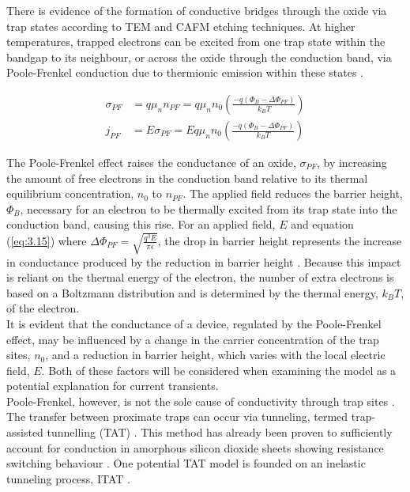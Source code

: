 \noindent There is evidence of the formation of conductive bridges through the oxide via trap states according to TEM \cite{munde2017intrinsic, wu2015evolution} and CAFM \cite{buckwell2015conductance} etching techniques. At higher temperatures, trapped electrons can be excited from one trap state within the bandgap to its neighbour, or across the oxide through the conduction band, via Poole-Frenkel conduction due to thermionic emission within these states \cite{frenkel1938pre}.

\begin{align}
    \sigma_{PF} &= q \mu_n n_{PF} = q \mu_n n_0 \left( \frac{-q (\Phi_B - \Delta\Phi_{PF}) }{k_B T} \right) \label{eq:3.14} \\
    j_{PF} &= E \sigma_{PF} = E q \mu_n n_0 \left( \frac{-q (\Phi_B - \Delta\Phi_{PF}) }{k_B T} \right) \label{eq:3.15}
\end{align}

\noindent The Poole-Frenkel effect raises the conductance of an oxide, $\sigma_{PF}$, by increasing the amount of free electrons in the conduction band relative to its thermal equilibrium concentration, $n_0$ to $n_{PF}$. The applied field reduces the barrier height, $\Phi_B$, necessary for an electron to be thermally excited from its trap state into the conduction band, causing this rise. For an applied field, $E$ and equation (\ref{eq:3.15}) where $\Delta \Phi_{PF} = \sqrt{\frac{q^3 E}{\pi \epsilon}}$, the drop in barrier height represents the increase in conductance produced by the reduction in barrier height \cite{sze2021physics}. Because this impact is reliant on the thermal energy of the electron, the number of extra electrons is based on a Boltzmann distribution and is determined by the thermal energy, $k_B T$, of the electron. \\

\noindent It is evident that the conductance of a device, regulated by the Poole-Frenkel effect, may be influenced by a change in the carrier concentration of the trap sites, $n_0$, and a reduction in barrier height, which varies with the local electric field, $E$. Both of these factors will be considered when examining the model as a potential explanation for current transients.\\

\noindent Poole-Frenkel, however, is not the sole cause of conductivity through trap sites \cite{dimaria1995mechanism}. The transfer between proximate traps can occur via tunneling, termed trap-assisted tunnelling (TAT) \cite{jimenez2001physical}. This method has already been proven to sufficiently account for conduction in amorphous silicon dioxide sheets showing resistance switching behaviour \cite{mehonic2012resistive}. One potential TAT model is founded on an inelastic tunneling process, ITAT \cite{ielmini2000modelingII}.\\

